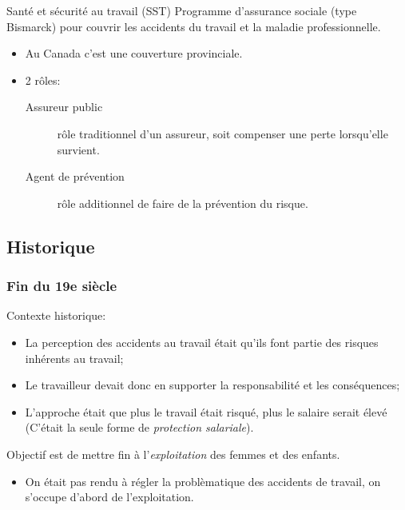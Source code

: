 \documentclass[10pt, french]{article}
\begin{document}
\begin{multicols*}{3}
\begin{conceptgen}{Santé et sécurité au travail (SST)}
Programme d'assurance sociale (type Bismarck) pour couvrir les accidents du travail et la maladie professionnelle. 
\begin{itemize}[leftmargin = *]
	\item	Au Canada c'est une couverture provinciale.
	\item	2 rôles:
		\begin{description}
		\item[Assureur public]	rôle traditionnel d'un assureur, soit compenser une perte lorsqu'elle survient.
		\item[Agent de prévention]	rôle additionnel de faire de la prévention du risque.
		\end{description}
\end{itemize}
\end{conceptgen}

\subsection*{Historique}
\subsubsection*{Fin du 19e siècle}

Contexte historique:
\begin{itemize}[leftmargin = *]
	\item	La perception des accidents au travail était qu'ils font partie des risques inhérents au travail;
	\item	Le travailleur devait donc en supporter la responsabilité et les conséquences;
	\item	L'approche était que plus le travail était risqué, plus le salaire serait élevé (C'était la seule forme de \textit{protection salariale}).
\end{itemize}

\begin{rappel_enhanced}
Objectif est de mettre fin à l'\textit{exploitation} des femmes et des enfants.

\begin{itemize}[leftmargin = *]
\item	On était pas rendu à régler la problèmatique des accidents de travail, on s'occupe d'abord de l'exploitation.
\end{itemize}
\end{rappel_enhanced}


\end{multicols*}
\end{document}

